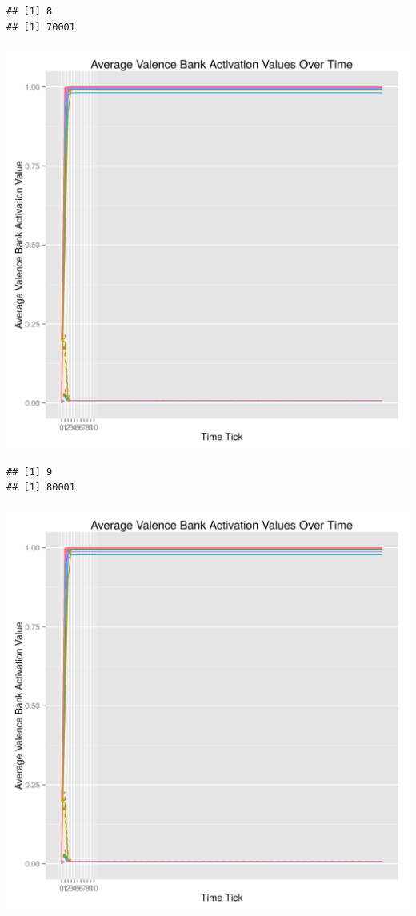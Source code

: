\documentclass{article}\usepackage[]{graphicx}\usepackage[]{color}
\makeatletter
\def\maxwidth{ %
  \ifdim\Gin@nat@width>\linewidth
    \linewidth
  \else
    \Gin@nat@width
  \fi
}
\newenvironment{kframe}{%
 \def\at@end@of@kframe{}%
 \ifinner\ifhmode%
  \def\at@end@of@kframe{\end{minipage}}%
  \begin{minipage}{\columnwidth}%
 \fi\fi%
 \def\FrameCommand##1{\hskip\@totalleftmargin \hskip-\fboxsep
 \colorbox{shadecolor}{##1}\hskip-\fboxsep
     \hskip-\linewidth \hskip-\@totalleftmargin \hskip\columnwidth}%
 \MakeFramed {\advance\hsize-\width
   \@totalleftmargin\z@ \linewidth\hsize
   \@setminipage}}%
 {\par\unskip\endMakeFramed%
 \at@end@of@kframe}
\newenvironment{knitrout}{}{} %
\makeatother
\begin{document}
\begin{knitrout}
\begin{kframe}\begin{verbatim}
## [1] 8
## [1] 70001
\end{verbatim}
\end{kframe}
\includegraphics[width=\maxwidth]{figure/unnamed-chunk-28} 
\begin{kframe}\begin{verbatim}
## [1] 9
## [1] 80001
\end{verbatim}
\end{kframe}
\includegraphics[width=\maxwidth]{figure/unnamed-chunk-29} 

\end{knitrout}
\end{document}
